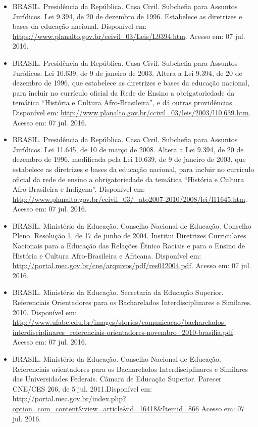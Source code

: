 \begin{itemize}
	
	\item BRASIL. Presidência da República. Casa Civil. Subchefia para Assuntos Jurídicos. Lei 9.394, de 20 de dezembro de 1996. Estabelece as diretrizes e bases da educação nacional. Disponível em: \url{https://www.planalto.gov.br/ccivil_03/Leis/L9394.htm}. Acesso em: 07 jul. 2016.
	
	\item BRASIL. Presidência da República. Casa Civil. Subchefia para Assuntos Jurídicos. Lei 10.639, de 9 de janeiro de 2003. Altera a Lei 9.394, de 20 de dezembro de 1996, que estabelece as diretrizes e bases da educação nacional, para incluir no currículo oficial da Rede de Ensino a obrigatoriedade da temática ``História e Cultura Afro-Brasileira'', e dá outras providências. Disponível em: \url{http://www.planalto.gov.br/ccivil_03/leis/2003/l10.639.htm}. Acesso em: 07 jul. 2016.
	
	\item BRASIL. Presidência da República. Casa Civil. Subchefia para Assuntos Jurídicos. Lei 11.645, de 10 de março de 2008. Altera a Lei 9.394, de 20 de dezembro de 1996, modificada pela Lei 10.639, de 9 de janeiro de 2003, que estabelece as diretrizes e bases da educação nacional, para incluir no currículo oficial da rede de ensino a obrigatoriedade da temática ``História e Cultura Afro-Brasileira e Indígena''. Disponível em: \url{http://www.planalto.gov.br/ccivil_03/_ato2007-2010/2008/lei/l11645.htm}. Acesso em:
	07 jul. 2016.
	
	\item BRASIL. Ministério da Educação. Conselho Nacional de Educação. Conselho Pleno. Resolução 1, de 17 de junho de 2004. Institui Diretrizes Curriculares Nacionais para a Educação das Relações Étnico Raciais e para o Ensino de História e Cultura Afro-Brasileira e Africana. Disponível em:
	\url{http://portal.mec.gov.br/cne/arquivos/pdf/res012004.pdf}. Acesso em: 07 jul. 2016.
	
	\item BRASIL. Ministério da Educação. Secretaria da Educação Superior. Referenciais Orientadores para os Bacharelados Interdisciplinares e Similares. 2010. Disponível em: \url{http://www.ufabc.edu.br/images/stories/comunicacao/bacharelados-interdisciplinares_referenciais-orientadores-novembro_2010-brasilia.pdf}. Acesso em: 07 jul. 2016.
	
	
	\item BRASIL. Ministério da Educação. Conselho Nacional de Educação. Referenciais orientadores para os Bacharelados Interdisciplinares e Similares das Universidades Federais. Câmara de Educação Superior. Parecer CNE/CES 266, de 5 jul. 2011.Disponível em: \url{http://portal.mec.gov.br/index.php?option=com_content&view=article&id=16418&Itemid=866} Acesso em: 07 jul. 2016.
	

\end{itemize}
